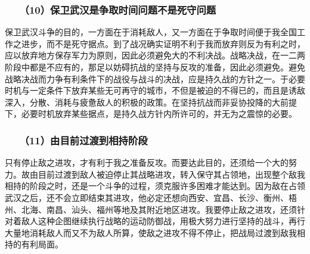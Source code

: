 \documentclass[cn,11pt,chinese]{elegantbook}
\def\myformat#1{\hfil\hfil #1}
\begin{document}
\subsubsection*{\myformat{　　（10）保卫武汉是争取时间问题不是死守问题}}
保卫武汉斗争的目的，一方面在于消耗敌人，又一方面在于争取时间便于我全国工作之进步，而不是死守据点。到了战况确实证明不利于我而放弃则反为有利之时，应以放弃地方保存军力为原则，因此必须避免大的不利决战。战略决战，在一二两阶段中都是不应有的，那足以妨碍抗战的坚持与反攻的准备，因此必须避免。避免战略决战而力争有利条件下的战役与战斗的决战，应是持久战的方针之一。于必要时机与一定条件下放弃某些无可再守的城市，不但是被迫的不得已的，而且是诱敌深入，分散、消耗与疲惫敌人的积极的政策。在坚持抗战而非妥协投降的大前提下，必要时机放弃某些据点，是持久战方针内所许可的，并无为之震惊的必要。\\
\subsubsection*{\myformat{　　（11）由目前过渡到相持阶段}}
只有停止敌之进攻，才有利于我之准备反攻。而要达此目的，还须给一个大的努力。故由目前过渡到敌人被迫停止其战略进攻，转入保守其占领地，出现整个敌我相持的阶段之时，还是一个斗争的过程，须克服许多困难才能达到。因为敌在占领武汉之后，还不会立即结束其进攻，他必定还想向西安、宜昌、长沙、衡州、梧州、北海、南昌、汕头、福州等地及其附近地区进攻。我要停止敌之进攻，还须针对着敌人这种企图继续执行战略的运动防御战，用极大努力进行坚持的战斗，再行大量地消耗敌人而又不为敌人所算，使敌之进攻不得不停止，把战局过渡到敌我相持的有利局面。\\
\end{document}
